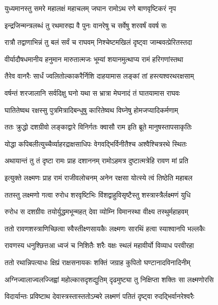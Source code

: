 \twolineshloka
{युध्यमानस्तु समरे महालक्षं महाचलम्}
{जघान रामोऽथ रणे बाणवृष्टिकरं नृप} %

\twolineshloka
{इन्द्रजिन्मन्त्रलब्धं तु रथमारुह्य वै पुनः}
{वानरेषु च सर्वेषु शरवर्षं ववर्ष सः} %

\twolineshloka
{रात्रौ तद्वाणाभिन्नं तु बलं सर्वं च राघवम्}
{निश्चेष्टमखिलं दृष्ट्वा जाम्बवत्प्रेरितस्तदा} %

\twolineshloka
{वीर्यादौषधमानीय हनुमान मारुतात्मजः}
{भूम्यां शयानमुत्थाप्य रामं हरिगणांस्तथा} %

\twolineshloka
{तैरेव वानरैः सार्धं ज्वलितोल्काकरैर्निशि}
{दाहयामास लङ्कां तां हस्त्यश्वरथरक्षसाम्} %

\twolineshloka
{वर्षन्तं शरजालानि सर्वदिक्षु घनो यथा}
{स भ्रात्रा मेघनादं तं घातयामास राघवः} %

\twolineshloka
{घातितेष्वथ रक्षस्सु पुत्रमित्रादिबन्धुषु}
{कारितेष्वथ विघ्नेषु होमजप्यादिकर्मणाम्} %

\twolineshloka
{ततः क्रुद्धो दशग्रीवो लङ्काद्वारे विनिर्गतः}
{क्वासौ राम इति ब्रूते मानुषस्तापसाकृतिः} %

\twolineshloka
{योद्धा कपिबलीत्युच्चैर्व्याहरद्राक्षसाधिपः}
{वेगवद्भिर्विनीतैश्च अश्वैश्चित्ररथे स्थितः} %

\twolineshloka
{अथायान्तं तु तं दृष्टा रामः प्राह दशाननम्}
{रामोऽहमत्र दुष्टात्मत्रेहि रावण मां प्रति} %

\twolineshloka
{इत्युक्ते लक्ष्मणः प्राह रामं राजीवलोचनम्}
{अनेन रक्षसा योत्स्ये त्वं तिष्ठेति महाबल} %

\twolineshloka
{ततस्तु लक्ष्मणो गत्वा रुरोध शरवृष्टिभिः}
{विंशद्वाहुविसृष्टैस्तु शस्त्रास्त्रैर्लक्ष्मणं युधि} %

\twolineshloka
{रुरोध स दशग्रीवः तयोर्युद्धमभून्महत्}
{देवा व्योम्नि विमानस्था वीक्ष्य तस्थुर्महाहवम्} %

\twolineshloka
{ततो रावणशस्त्राणिच्छित्वा स्वैस्तीक्ष्णसायकैः}
{लक्ष्मणः सारथिं हत्वा स्याश्वानपि भल्लकैः} %

\twolineshloka
{रावणस्य धनुश्छित्तआ ध्वजं च निशितैः शरैः}
{वक्षः स्थलं महावीर्यो विव्याध परवीरहा} %

\twolineshloka
{ततो रथान्निपत्याधः क्षिप्रं राक्षसनायकः}
{शक्तिं जग्राह कुपितो घण्टानादविनादिनीम्} %

\twolineshloka
{अग्निज्वालाज्वलज्जिह्वां महोल्कासदृशद्युतिम्}
{दृढमुष्ट्या तु निक्षिप्ता शक्तिः सा लक्ष्मणोरसि} %

\twolineshloka
{विदार्यान्तः प्रविष्टाथ देवास्त्रस्तास्ततोऽम्बरे}
{लक्ष्मणं पतितं दृष्ट्वा रुदद्भिर्वानरेश्वरैः} %

